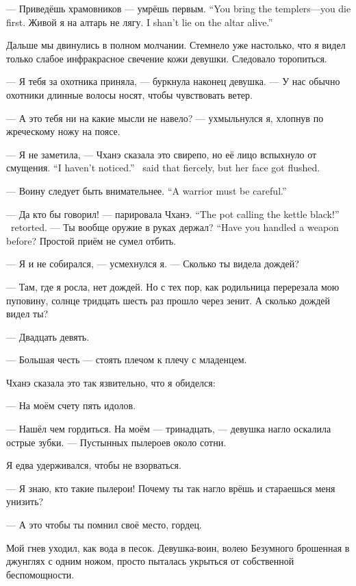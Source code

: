 {--- Приведёшь храмовников --- умрёшь первым.}
{``You bring the templers---you die first.}
{Живой я на алтарь не лягу.}
{I shan't lie on the altar alive.''}

Дальше мы двинулись в полном молчании.
Стемнело уже настолько, что я видел только слабое инфракрасное свечение кожи девушки.
Следовало торопиться.

--- Я тебя за охотника приняла, --- буркнула наконец девушка.
--- У нас обычно охотники длинные волосы носят, чтобы чувствовать ветер.

--- А это тебя ни на какие мысли не навело? --- ухмыльнулся я, хлопнув по жреческому ножу на поясе.

{--- Я не заметила, --- Чханэ сказала это свирепо, но её лицо вспыхнуло от смущения.}
{``I haven't noticed.'' \Chhanei\ said that fiercely, but her face got flushed.}

{--- Воину следует быть внимательнее.}
{``A warrior must be careful.''}

{--- Да кто бы говорил! --- парировала Чханэ.}
{``The pot calling the kettle black!'' \Chhanei\ retorted.}
{--- Ты вообще оружие в руках держал?}
{``Have you handled a weapon before?}
Простой приём не сумел отбить.

--- Я и не собирался, --- усмехнулся я.
--- Сколько ты видела дождей?

--- Там, где я росла, нет дождей.
Но с тех пор, как родильница перерезала мою пуповину, солнце тридцать шесть раз прошло через зенит.
А сколько дождей видел ты?

--- Двадцать девять.

--- Большая честь --- стоять плечом к плечу с младенцем.

Чханэ сказала это так язвительно, что я обиделся:

--- На моём счету пять идолов.

--- Нашёл чем гордиться.
На моём --- тринадцать, --- девушка нагло оскалила острые зубки.
--- Пустынных пылероев около сотни.

Я едва удерживался, чтобы не взорваться.

--- Я знаю, кто такие пылерои!
Почему ты так нагло врёшь и стараешься меня унизить?

--- А это чтобы ты помнил своё место, гордец.

Мой гнев уходил, как вода в песок.
Девушка-воин, волею Безумного брошенная в джунглях с одним ножом, просто пыталась укрыться от собственной беспомощности.


